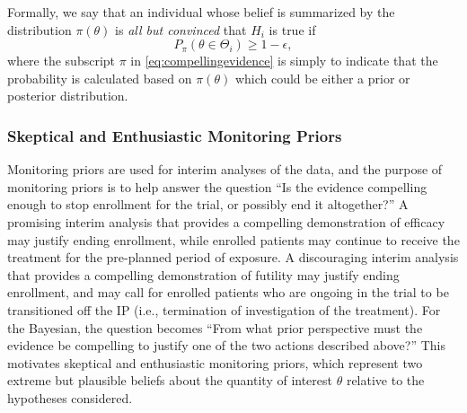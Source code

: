 \documentclass[AMA,STIX1COL,doublespace]{WileyNJD-v2}
\begin{document}
Formally, we say that an individual whose belief is summarized by the distribution $\pi\left(\theta\right)$ is \textit{all but convinced} that $H_i$ is true if 
\begin{equation}\label{eq:compellingevidence}
		P_\pi(\theta\in\Theta_i)\geq 1-\epsilon,
\end{equation} 
where the subscript $\pi$ in \eqref{eq:compellingevidence} is simply to indicate that the probability is calculated based on $\pi\left(\theta\right)$ which could be either a prior
or posterior distribution.

\subsubsection{Skeptical and Enthusiastic Monitoring Priors}\label{sec:MP}
Monitoring priors are used for interim analyses of the data, and the purpose of monitoring priors is to help answer the question ``Is the evidence compelling enough to stop enrollment for the trial, or possibly end it altogether?''
%
A promising interim analysis that provides a compelling demonstration of efficacy may justify ending enrollment, while enrolled patients may continue to receive the treatment for the pre-planned period of exposure. 
%
A discouraging interim analysis that provides a compelling demonstration of futility may justify ending enrollment, and may call for enrolled patients who are ongoing in the trial to be transitioned off the IP (i.e., termination of investigation of the treatment). 
%
For the Bayesian, the question becomes ``From what prior perspective must the evidence be compelling to justify one of the two actions described above?'' 
%
This motivates skeptical and enthusiastic monitoring priors, which represent two extreme but plausible beliefs about the quantity of interest $\theta$ relative to the hypotheses considered.
%
\end{document}
